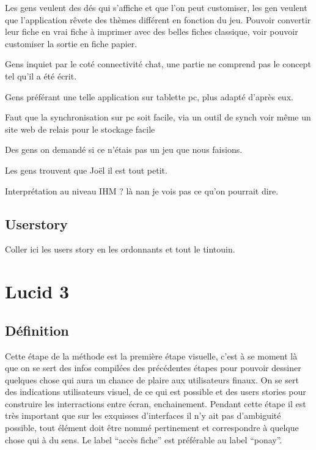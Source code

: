 \documentclass[11pt,a4paper]{article}
\begin{document}
Les gens veulent des dés qui s'affiche et que l'on peut customiser, les gen
veulent que l'application rêvete des thèmes différent en fonction du jeu.
Pouvoir convertir leur fiche en vrai fiche à imprimer avec des belles fiches
classique, voir pouvoir customiser la sortie en fiche papier.

Gens inquiet par le coté connectivité chat, une partie ne comprend pas le
concept tel qu'il a été écrit.


Gens préférant une telle application sur tablette pc, plus adapté d'après eux.

Faut que la synchronisation sur pc soit facile, via un outil de synch
voir même un site web de relais pour le stockage facile

Des gens on demandé si ce n'étais pas un jeu que nous faisions.

Les gens trouvent que Joël il est tout petit.

Interprétation au niveau IHM ? là nan je vois pas ce qu'on pourrait dire.

\subsection{Userstory}

Coller ici les users story en les ordonnants et tout le tintouin.













\section{Lucid 3}

\subsection{Définition}

Cette étape de la méthode est la première étape visuelle, c'est à se moment là
que on se sert des infos compilées des précédentes étapes pour pouvoir dessiner
quelques chose qui aura un chance de plaire aux utilisateurs finaux.
On se sert des indications utilisateurs visuel, de ce qui est possible et des
users stories pour construire les interractions entre écran, enchainement.
Pendant cette étape il est très important que sur les exquisses d'interfaces il
n'y ait pas d'ambiguité possible, tout élément doit être nommé pertinement et
correspondre à quelque chose qui à du sens. Le label ``accès fiche'' est
préférable au label ``ponay''. 
\end{document}
